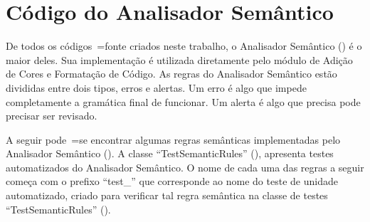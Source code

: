 \chapter[Analisador Semântico]{Código do Analisador Semântico}

De todos os códigos~=fonte criados neste trabalho,
o Analisador Semântico () é o maior deles.
Sua implementação é utilizada diretamente pelo módulo de Adição de Cores e
Formatação de Código.
As regras do Analisador Semântico estão divididas entre dois tipos,
erros e
alertas.
Um erro é algo que impede completamente a gramática final de funcionar.
Um alerta é algo que precisa pode precisar ser revisado.

A seguir pode~=se encontrar algumas regras semânticas implementadas pelo Analisador Semântico ().
A classe ``TestSemanticRules'' (),
apresenta testes automatizados do Analisador Semântico.
O nome de cada uma das regras a seguir começa com o prefixo ``test\_'' que corresponde ao nome do teste de unidade automatizado,
criado para verificar tal regra semântica na classe de testes ``TestSemanticRules'' ().
